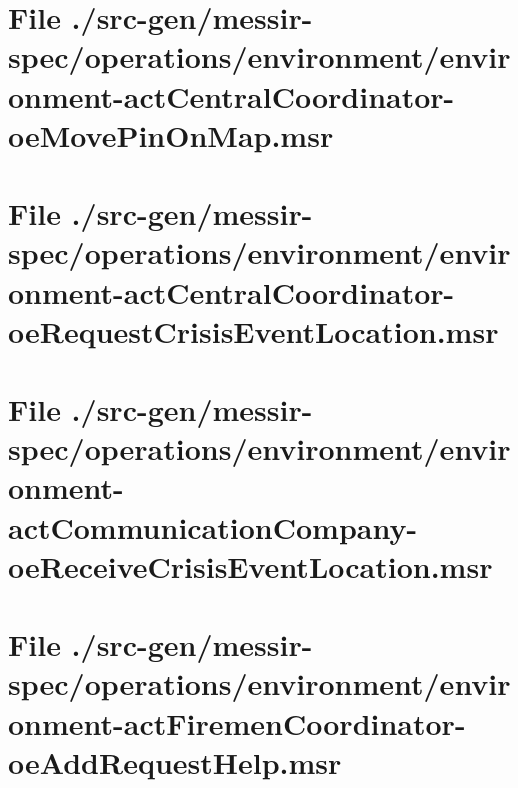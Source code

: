 \section[File /src-gen.../environment-actCentralCoordinator-oeMovePinOnMap.msr]{File ./src-gen/messir-spec/operations/environment/environment-actCentralCoordinator-oeMovePinOnMap.msr}
\scriptsize

\normalsize
	
\section[File /.../environment-actCentralCoordinator-oeRequestCrisisEventLocation.msr]{File ./src-gen/messir-spec/operations/environment/environment-actCentralCoordinator-oeRequestCrisisEventLocation.msr}
\scriptsize

\normalsize
	
\section[File /.../environment-actCommunicationCompany-oeReceiveCrisisEventLocation.msr]{File ./src-gen/messir-spec/operations/environment/environment-actCommunicationCompany-oeReceiveCrisisEventLocation.msr}
\scriptsize

\normalsize
	
\section[File /src-gen.../environment-actFiremenCoordinator-oeAddRequestHelp.msr]{File ./src-gen/messir-spec/operations/environment/environment-actFiremenCoordinator-oeAddRequestHelp.msr}
\scriptsize

\normalsize
	
